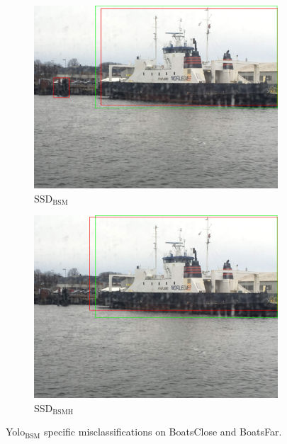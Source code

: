 \begin{figure}[h!]
\begin{subfigure}{.5\textwidth}
  \centering
  \includegraphics[width=0.8\linewidth]{results/case_buildings/ssdtrf/ssd2/3better/IMG_2570.jpg}
  \caption{SSD$_{\text{BSM}}$}
\end{subfigure}%
\begin{subfigure}{.5\textwidth}
  \centering
  \includegraphics[width=.8\linewidth]{results/case_buildings/ssdtrf/ssd3/3better/IMG_2570.jpg}
  \caption{SSD$_{\text{BSMH}}$}
\end{subfigure}
\caption{Yolo$_{\text{BSM}}$ specific misclassifications on BoatsClose and BoatsFar.}
\label{img:yolo2_misclas}


\end{figure}
